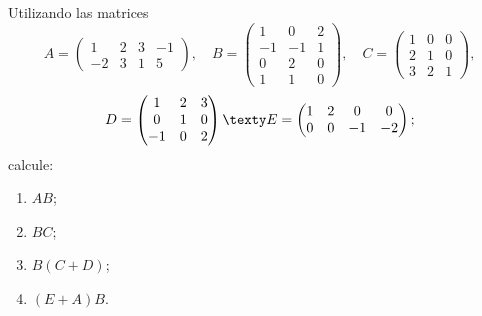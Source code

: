 \documentclass[a4,11pt]{aleph-notas}
\begin{document}
\begin{ejer}
    Utilizando las matrices
    \[
    A = \begin{pmatrix}1&2&3&-1\\-2&3&1&5\end{pmatrix}, \quad 
    B=\begin{pmatrix} 1 &0 &2 \\ -1& -1& 1\\ 0&2& 0 \\ 1& 1& 0\end{pmatrix}, \quad C=\begin{pmatrix}1&0&0\\2&1&0 \\3&2&1\end{pmatrix}, 
    \]
    \[
    D=\begin{pmatrix}1&2&3\\0&1&0\\-1&0&2\end{pmatrix} \texty E=\begin{pmatrix}1&2&0&0\\0&0&-1&-2\end{pmatrix};
    \] 
    calcule:
    \begin{enumerate}
        \item $AB$;
        \item $BC$;
        \item $B(C+D)$;
        \item $(E+A)B$.
    \end{enumerate}
\end{ejer}
\end{document}
